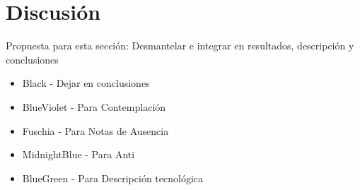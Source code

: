
\section*{Discusión}

Propuesta para esta sección: Desmantelar e integrar en resultados, descripción y conclusiones

\begin{itemize}

  \color{black}

\item {Black - Dejar en conclusiones}

  \color{BlueViolet}

\item BlueViolet - Para Contemplación 
  
  \color{Fuchsia}
  
\item Fuschia - Para Notas de Ausencia

  \color{MidnightBlue}

\item MidnightBlue - Para Anti

  \color{BlueGreen}

\item BlueGreen - Para Descripción tecnológica
  
\end{itemize}




\color{BlueViolet}


